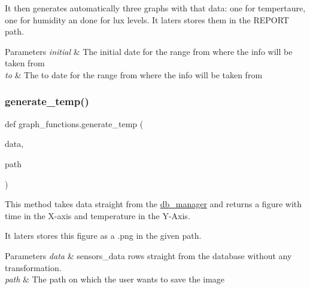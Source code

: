 It then generates automatically three graphs with that data\+: one for tempertaure, one for humidity an done for lux levels. It laters stores them in the R\+E\+P\+O\+RT path. 
\begin{DoxyParams}{Parameters}
{\em initial} & The initial date for the range from where the info will be taken from \\
\hline
{\em to} & The to date for the range from where the info will be taken from \\
\hline
\end{DoxyParams}
\mbox{\label{namespacegraph__functions_af59a4f9c95f5173f003a7f8daf772e4c}} 
\subsubsection{\texorpdfstring{generate\+\_\+temp()}{generate\_temp()}}
{\footnotesize\ttfamily def graph\+\_\+functions.\+generate\+\_\+temp (\begin{DoxyParamCaption}\item[{}]{data,  }\item[{}]{path }\end{DoxyParamCaption})}



This method takes data straight from the \textquotesingle{}\hyperlink{namespacedb__manager}{db\+\_\+manager}\textquotesingle{} and returns a figure with time in the X-\/axis and temperature in the Y-\/\+Axis. 

It laters stores this figure as a .png in the given path. 
\begin{DoxyParams}{Parameters}
{\em data} & \textquotesingle{}sensors\+\_\+data\textquotesingle{} rows straight from the database without any transformation. \\
\hline
{\em path} & The path on which the user wants to save the image \\
\hline
\end{DoxyParams}
\mbox{\label{namespacegraph__functions_ad259f0d25aaeea64fa4715826511cacc}} 
